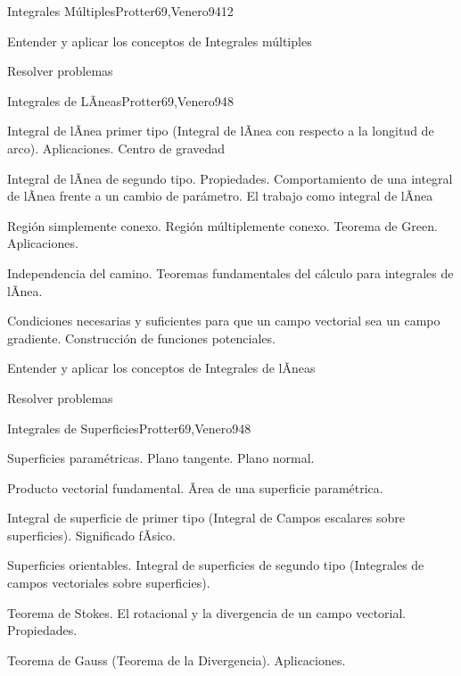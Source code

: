 \begin{syllabus}
\begin{unit}{Integrales Múltiples}{Protter69,Venero94}{12}
   \begin{unitgoals}
         \item  Entender y aplicar los conceptos de Integrales múltiples
         \item  Resolver problemas
   \end{unitgoals}
\end{unit}

\begin{unit}{Integrales de LÃ­neas}{Protter69,Venero94}{8}
   \begin{topics}
	\item  Integral de lÃ­nea primer tipo (Integral de lÃ­nea con respecto a la longitud de arco). Aplicaciones. Centro de gravedad
	\item  Integral de lÃ­nea de segundo tipo. Propiedades. Comportamiento de una integral de lÃ­nea frente a un cambio de parámetro. El trabajo como integral de lÃ­nea
	\item  Región simplemente conexo. Región múltiplemente conexo. Teorema de Green. Aplicaciones.
	\item  Independencia del camino. Teoremas fundamentales del cálculo para integrales de lÃ­nea.
	\item Condiciones necesarias y suficientes para que un campo vectorial sea un campo gradiente. Construcción de funciones potenciales.
   \end{topics}

   \begin{unitgoals}
         \item  Entender y aplicar los conceptos de Integrales de lÃ­neas
         \item  Resolver problemas
   \end{unitgoals}
\end{unit}

\begin{unit}{Integrales de Superficies}{Protter69,Venero94}{8}
   \begin{topics}
         \item  Superficies paramétricas. Plano tangente. Plano normal.
	 \item  Producto vectorial fundamental. Ãrea de una superficie paramétrica.
         \item  Integral de superficie de primer tipo (Integral de Campos escalares sobre superficies). Significado fÃ­sico.
	 \item  Superficies orientables. Integral de superficies de segundo tipo (Integrales de campos vectoriales sobre superficies).
         \item  Teorema de Stokes. El rotacional y la divergencia de un campo vectorial. Propiedades.
         \item  Teorema de Gauss (Teorema de la Divergencia). Aplicaciones.
   \end{topics}


\end{unit}
\end{syllabus}
